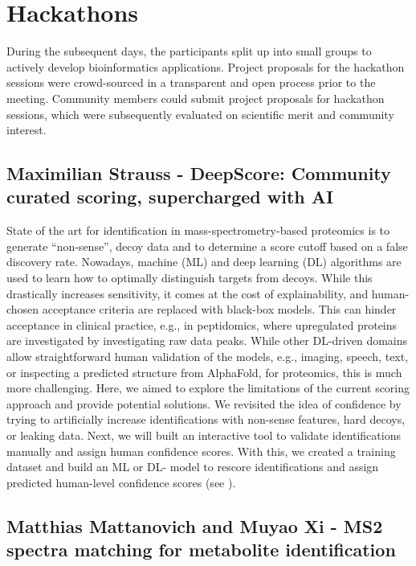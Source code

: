 \section{Hackathons}

During the subsequent days, the participants split up into small groups to actively develop bioinformatics applications. Project proposals for the hackathon sessions were crowd-sourced in a transparent and open process \citep{EuBIC2023GitHub} prior to the meeting.
Community members could submit project proposals for hackathon sessions, which were subsequently evaluated on scientific merit and community interest.


\subsection{Maximilian Strauss - DeepScore: Community curated scoring, supercharged with AI}

State of the art for identification in mass-spectrometry-based proteomics is to generate “non-sense”, decoy data and to determine a score cutoff based on a false discovery rate. Nowadays, machine (ML) and deep learning (DL) algorithms are used to learn how to optimally distinguish targets from decoys. While this drastically increases sensitivity, it comes at the cost of explainability, and human-chosen acceptance criteria are replaced with black-box models. This can hinder acceptance in clinical practice, e.g., in peptidomics, where upregulated proteins are investigated by investigating raw data peaks. While other DL-driven domains allow straightforward human validation of the models, e.g., imaging, speech, text, or inspecting a predicted structure from AlphaFold, for proteomics, this is much more challenging. Here, we aimed to explore the limitations of the current scoring approach and provide potential solutions. We revisited the idea of confidence by trying to artificially increase identifications with non-sense features, hard decoys, or leaking data. Next, we will built an interactive tool to validate identifications manually and assign human confidence scores. With this, we created a training dataset and build an ML or DL- model to rescore identifications and assign predicted human-level confidence scores (see \citep{issue14}).


\subsection{Matthias Mattanovich and Muyao Xi - MS2 spectra matching for metabolite identification}

